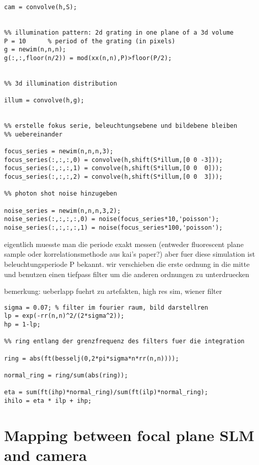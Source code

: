 \begin{lstlisting}[style=mymatlab]
%% image of the 3d fluorophore distribution
cam = convolve(h,S);


%% illumination pattern: 2d grating in one plane of a 3d volume
P = 10      % period of the grating (in pixels)
g = newim(n,n,n);
g(:,:,floor(n/2)) = mod(xx(n,n),P)>floor(P/2);


%% 3d illumination distribution

illum = convolve(h,g);


%% erstelle fokus serie, beleuchtungsebene und bildebene bleiben
%% uebereinander

focus_series = newim(n,n,n,3);
focus_series(:,:,:,0) = convolve(h,shift(S*illum,[0 0 -3]));
focus_series(:,:,:,1) = convolve(h,shift(S*illum,[0 0  0]));
focus_series(:,:,:,2) = convolve(h,shift(S*illum,[0 0  3]));

%% photon shot noise hinzugeben

noise_series = newim(n,n,n,3,2);
noise_series(:,:,:,:,0) = noise(focus_series*10,'poisson');
noise_series(:,:,:,:,1) = noise(focus_series*100,'poisson');
\end{lstlisting}

eigentlich muesste man die periode exakt messen (entweder
fluorescent plane sample oder korrelationsmethode aus kai's paper?)
aber fuer diese simulation ist beleuchtungsperiode P bekannt. wir
verschieben die erste ordnung in die mitte und benutzen einen
tiefpass filter um die anderen ordnungen zu unterdruecken

bemerkung: ueberlapp fuehrt zu artefakten, high res sim, wiener
filter 

\begin{lstlisting}[style=mymatlab]
sigma = 0.07; % filter im fourier raum, bild darstellren
lp = exp(-rr(n,n)^2/(2*sigma^2));
hp = 1-lp;

%% ring entlang der grenzfrequenz des filters fuer die integration

ring = abs(ft(besselj(0,2*pi*sigma*n*rr(n,n))));

normal_ring = ring/sum(abs(ring));

eta = sum(ft(ihp)*normal_ring)/sum(ft(ilp)*normal_ring);
ihilo = eta * ilp + ihp;
\end{lstlisting}


\chapter{Mapping between focal plane SLM and camera}
\label{sec:app_map}
